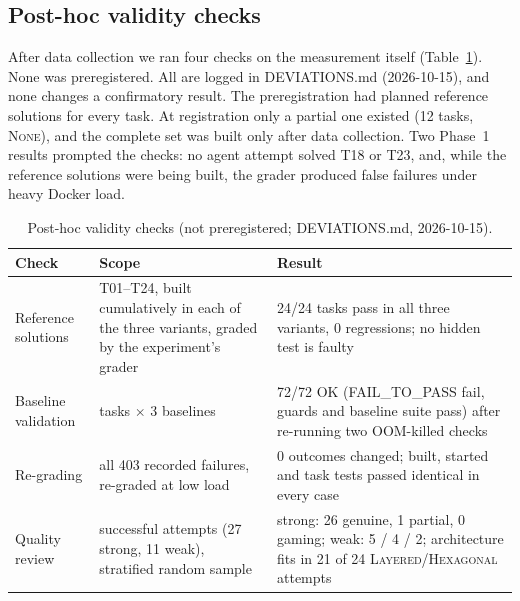 \documentclass[10pt]{article}
\newcommand{\NONE}{\textsc{None}}
\newcommand{\LAY}{\textsc{Layered}}
\newcommand{\HEX}{\textsc{Hexagonal}}
\begin{document}
\subsection{Post-hoc validity checks}\label{sec:res-validity}

After data collection we ran four checks on the measurement itself (Table~\ref{tab:validity}).
None was preregistered. All are logged in DEVIATIONS.md (2026-10-15), and none changes a
confirmatory result. The preregistration had planned reference solutions for every task. At
registration only a partial one existed (12 tasks, \NONE), and the complete set was built only
after data collection. Two Phase~1 results prompted the checks: no agent attempt solved T18 or
T23, and, while the reference solutions were being built, the grader produced false failures under
heavy Docker load.

\begin{table}[tbp]\centering
\caption{Post-hoc validity checks (not preregistered; DEVIATIONS.md, 2026-10-15).}
\label{tab:validity}
\footnotesize
\begin{tabularx}{\textwidth}{@{}>{\raggedright\arraybackslash}p{2.6cm}>{\raggedright\arraybackslash}p{4.3cm}X@{}}
\toprule
Check & Scope & Result\\
\midrule
Reference solutions & T01--T24, built cumulatively in each of the three variants, graded by the experiment's grader & 24/24 tasks pass in all three variants, 0 regressions; no hidden test is faulty\\
Baseline validation & 24 tasks $\times$ 3 baselines & 72/72 OK (FAIL\_TO\_PASS fail, guards and baseline suite pass) after re-running two OOM-killed checks\\
Re-grading & all 403 recorded failures, re-graded at low load & 0 outcomes changed; built, started and task tests passed identical in every case\\
Quality review & 38 successful attempts (27 strong, 11 weak), stratified random sample & strong: 26 genuine, 1 partial, 0 gaming; weak: 5 / 4 / 2; architecture fits in 21 of 24 \LAY/\HEX{} attempts\\
\bottomrule
\end{tabularx}
\end{table}
\end{document}
